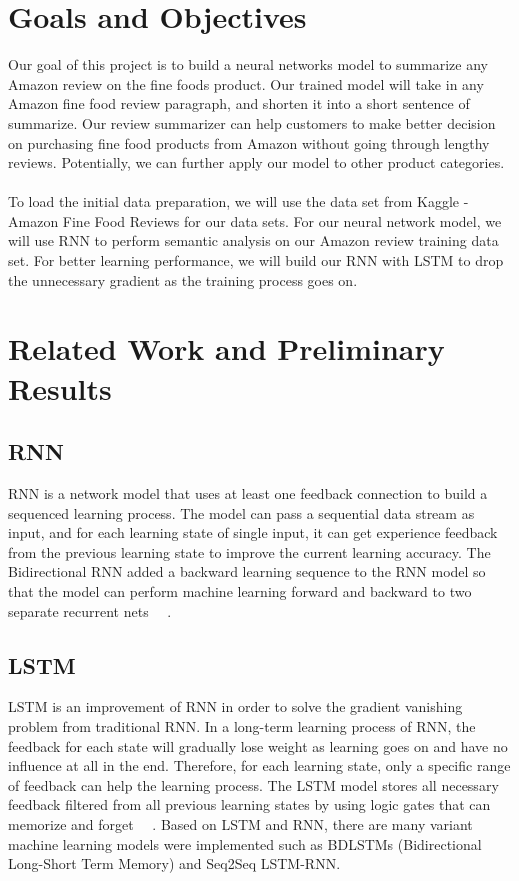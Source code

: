 \documentclass[conference]{IEEEtran}
\begin{document}
\section{Goals and Objectives}
Our goal of this project is to build a neural networks model to summarize any Amazon review on the fine foods product. Our trained model will take in any Amazon fine food review paragraph, and shorten it into a short sentence of summarize. Our review summarizer can help customers to make better decision on purchasing fine food products from Amazon without going through lengthy reviews. Potentially, we can further apply our model to other product categories.\\\\
\indent To load the initial data preparation, we will use the data set from Kaggle - Amazon Fine Food Reviews for our data sets. For our neural network model, we will use RNN to perform semantic analysis on our Amazon review training data set. For better learning performance, we will build our RNN with LSTM to drop the unnecessary gradient as the training process goes on.

\section{Related Work and Preliminary Results}
\subsection{RNN}
RNN is a network model that uses at least one feedback connection to build a sequenced learning process. The model can pass a sequential data stream as input, and for each learning state of single input, it can get experience feedback from the previous learning state to improve the current learning accuracy. The Bidirectional RNN added a backward learning sequence to the RNN model so that the model can perform machine learning forward and backward to two separate recurrent nets ~\cite{vu2016bi}~\cite{schuster1997bidirectional}. 
\subsection{LSTM}
LSTM is an improvement of RNN in order to solve the gradient vanishing problem from traditional RNN. In a long-term learning process of RNN, the feedback for each state will gradually lose weight as learning goes on and have no influence at all in the end. Therefore, for each learning state, only a specific range of feedback can help the learning process. The LSTM model stores all necessary feedback filtered from all previous learning states by using logic gates that can memorize and forget ~\cite{hochreiter1997long}~\cite{gers2000learning}. Based on LSTM and RNN, there are many variant machine learning models were implemented such as BDLSTMs (Bidirectional Long-Short Term Memory) and Seq2Seq LSTM-RNN. 
\end{document}
